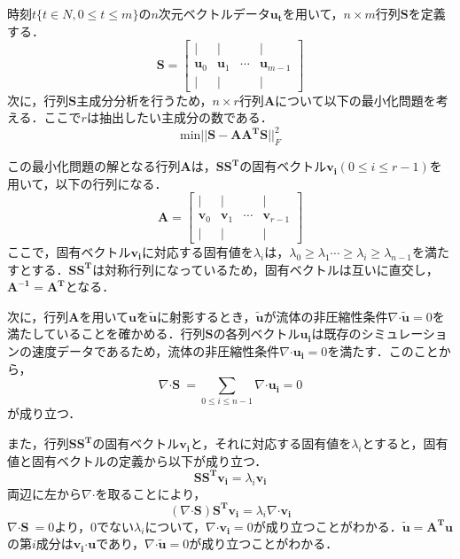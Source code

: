 \documentclass[a4j,12pt]{jreport}
\begin{document}
	時刻$t \{t \in N, 0 \le t \le m\}$の$n$次元ベクトルデータ$\bm{u_t}$を用いて，$n\times m$行列$\bm{S}$を定義する．
		 \[ \bm{S} = 
        		\begin{bmatrix}
   | & | &  & |\\
   \bm{u}_0 & \bm{u}_1 &\cdots  & \bm{u}_{m-1} \\
   | & | &  & |
\end{bmatrix}
\]
次に，行列$\bm{S}$主成分分析を行うため，$n \times r$行列$\bm{A}$について以下の最小化問題を考える．ここで$r$は抽出したい主成分の数である．
\[
\text{min} || \bm{S} -  \bm{A}\bm{A^T} \bm{S}||^2_F
\]


この最小化問題の解となる行列$\bm{A}$は，$\bm{S}\bm{S^T}$の固有ベクトル$\bm{v_i}(0 \le i \le r-1)$を用いて，以下の行列になる．
 \[ 
 \bm{A}  = 
        		\begin{bmatrix}
   | & | &  & |\\
   \bm{v}_0 & \bm{v}_1 &\cdots  & \bm{v}_{r-1} \\
   | & | &  & |
\end{bmatrix}
\]
ここで，固有ベクトル$\bm{v_i}$に対応する固有値を$\lambda_i$は，$\lambda_0 \ge \lambda_1 \cdots \ge \lambda_i \ge \lambda_{n-1} $を満たすとする．$\bm{S}\bm{S^T}$は対称行列になっているため，固有ベクトルは互いに直交し，$\bm{A^{-1}} = \bm{A^T}$となる．%

次に，行列$\bm{A}$を用いて$\bm{u}$を$\bm{\tilde{u}}$に射影するとき，$\bm{\tilde{u}}$が流体の非圧縮性条件$\nabla\boldsymbol{\cdot}\bm{\tilde{u}} = 0$を満たしていることを確かめる．行列$\bm{S}$の各列ベクトル$\bm{u_i}$は既存のシミュレーションの速度データであるため，流体の非圧縮性条件$\nabla\boldsymbol{\cdot}\bm{u_i} = 0$を満たす．このことから，
\[
	\nabla\boldsymbol{\cdot}\bm{S}\ = \sum_{0 \le i \le n-1}\nabla\boldsymbol{\cdot}\bm{u_i} = 0
\]
が成り立つ．

また，行列$\bm{S}\bm{S^T}$の固有ベクトル$\bm{v_i}$と，それに対応する固有値を$\lambda_i$とすると，固有値と固有ベクトルの定義から以下が成り立つ．
\[
	\bm{S}\bm{S^T}\bm{v_i} = \lambda_i\bm{v_i}
\]
両辺に左から$\nabla\boldsymbol{\cdot}$を取ることにより，
\[
	(\nabla\boldsymbol{\cdot}\bm{S})\bm{S^T}\bm{v_i} = \lambda_i\nabla\boldsymbol{\cdot}\bm{v_i}
\]
$\nabla\boldsymbol{\cdot}\bm{S}\ = 0$より，0でない$ \lambda_i$について，$\nabla\boldsymbol{\cdot}\bm{v_i} = 0$が成り立つことがわかる．$\bm{\tilde{u}} = \bm{A^T}\bm{u}$の第$i$成分は$\bm{v_i}\boldsymbol{\cdot}\bm{u}$であり，$\nabla\boldsymbol{\cdot}\bm{\tilde{u}} =  0$が成り立つことがわかる．
\end{document}
